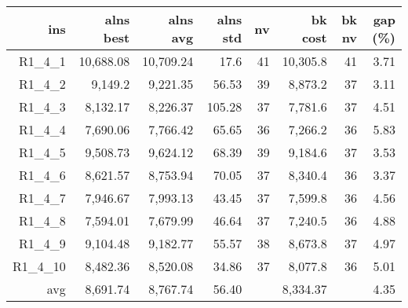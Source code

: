   \begin{table}[caption={Kết quả đo với tập HG\_R\_1\_4 400 yêu cầu}, label=exp:HGR14]
    \centering
    \begin{tabular}{rrrrrrrr}
    \hline
    ins & alns best & alns avg & alns std & nv & bk cost & bk nv & gap (\%) \\ \hline
    R1\_4\_1 & 10,688.08 & 10,709.24 & 17.6 & 41 & 10,305.8 & 41 & 3.71 \\ \hline
    R1\_4\_2 & 9,149.2 & 9,221.35 & 56.53 & 39 & 8,873.2 & 37 & 3.11 \\ \hline
    R1\_4\_3 & 8,132.17 & 8,226.37 & 105.28 & 37 & 7,781.6 & 37 & 4.51 \\ \hline
    R1\_4\_4 & 7,690.06 & 7,766.42 & 65.65 & 36 & 7,266.2 & 36 & 5.83 \\ \hline
    R1\_4\_5 & 9,508.73 & 9,624.12 & 68.39 & 39 & 9,184.6 & 37 & 3.53 \\ \hline
    R1\_4\_6 & 8,621.57 & 8,753.94 & 70.05 & 37 & 8,340.4 & 36 & 3.37 \\ \hline
    R1\_4\_7 & 7,946.67 & 7,993.13 & 43.45 & 37 & 7,599.8 & 36 & 4.56 \\ \hline
    R1\_4\_8 & 7,594.01 & 7,679.99 & 46.64 & 37 & 7,240.5 & 36 & 4.88 \\ \hline
    R1\_4\_9 & 9,104.48 & 9,182.77 & 55.57 & 38 & 8,673.8 & 37 & 4.97 \\ \hline
    R1\_4\_10 & 8,482.36 & 8,520.08 & 34.86 & 37 & 8,077.8 & 36 & 5.01 \\ \hline
    avg & 8,691.74 & 8,767.74 & 56.40 & & 8,334.37 & & 4.35 \\ \hline
    \end{tabular}
  \end{table}

